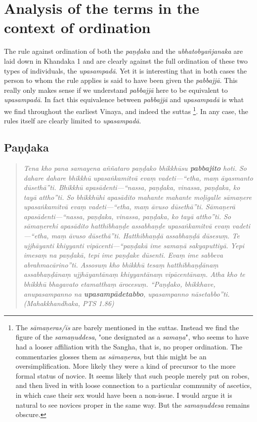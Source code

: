 \section{Analysis of the terms in the context of ordination}

The rule against ordination of both the {\em paṇḍaka } and the {\em ubhatob­yañ­janaka } are laid down in Khandaka 1 and are clearly against the full ordination of these two types of individuals, the {\em upasampadā}. Yet it is interesting that in both cases the person to whom the rule applies is said to have been given the {\em pabbajjā}. This really only makes sense if we understand {\em pabbajjā} here to be equivalent to {\em upasampadā}. In fact this equivalence between {\em pabbajjā} and {\em upasampadā} is what we find throughout the earliest Vinaya, and indeed the suttas \footnote{The {\em sāmaṇeras/īs} are barely mentioned in the suttas. Instead we find the figure of the {\em samaṇuddesa}, "one designated as a {\em samaṇa}", who seems to have had a looser affiliation with the Sangha, that is, no proper ordination. The commentaries glosses them as {\em sāmaṇeras}, but this might be an oversimplification. More likely they were a kind of precursor to the more formal status of novice. It seems likely that such people merely put on robes, and then lived in with loose connection to a particular community of ascetics, in which case their sex would have been a non-issue. I would argue it is natural to see novices proper in the same way. But the {\em samaṇuddesa} remains obscure.}. In any case, the rules itself are clearly limited to {\em upasampadā}.

\subsection{Paṇḍaka}

\begin{quote}
{\em Tena kho pana samayena aññataro paṇḍako bhikkhūsu \textbf{pabbajito} hoti. So dahare dahare bhikkhū upasaṅkamitvā evaṃ vadeti—“etha, maṃ āyasmanto dūsethā”ti. Bhikkhū apasādenti—“nassa, paṇḍaka, vinassa, paṇḍaka, ko tayā attho”ti. So bhikkhūhi apasādito mahante mahante moḷigalle sāmaṇere upasaṅkamitvā evaṃ vadeti—“etha, maṃ āvuso dūsethā”ti. Sāmaṇerā apasādenti—“nassa, paṇḍaka, vinassa, paṇḍaka, ko tayā attho”ti. So sāmaṇerehi apasādito hatthibhaṇḍe assabhaṇḍe upasaṅkamitvā evaṃ vadeti—“etha, maṃ āvuso dūsethā”ti. Hatthibhaṇḍā assabhaṇḍā dūsesuṃ. Te ujjhāyanti khiyyanti vipācenti—“paṇḍakā ime samaṇā sakyaputtiyā. Yepi imesaṃ na paṇḍakā, tepi ime paṇḍake dūsenti. Evaṃ ime sabbeva abrahmacārino”ti. Assosuṃ kho bhikkhū tesaṃ hatthibhaṇḍānaṃ assabhaṇḍānaṃ ujjhāyantānaṃ khiyyantānaṃ vipācentānaṃ. Atha kho te bhikkhū bhagavato etamatthaṃ ārocesuṃ. “Paṇḍako, bhikkhave, anupasampanno na \textbf{upasampādetabbo}, upasampanno nāsetabbo”ti. (Mahakkhandhaka, PTS 1.86)}
\end{quote}

